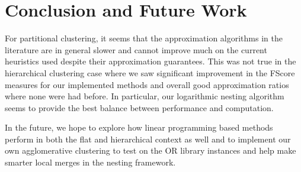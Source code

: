 \documentclass{article}
\begin{document}
\section{Conclusion and Future Work}
For partitional clustering, it seems that the approximation algorithms in the literature are in general slower and cannot improve much on the current heuristics used despite their approximation guarantees. This was not true in the hierarchical clustering case where we saw significant improvement in the FScore measures for our implemented methods and overall good approximation ratios where none were had before. In particular, our logarithmic nesting algorithm seems to provide the best balance between performance and computation.

In the future, we hope to explore how linear programming based methods perform in both the flat and hierarchical context as well and to implement our own agglomerative clustering to test on the OR library instances and help make smarter local merges in the nesting framework.


\label{submission}




\end{document}
